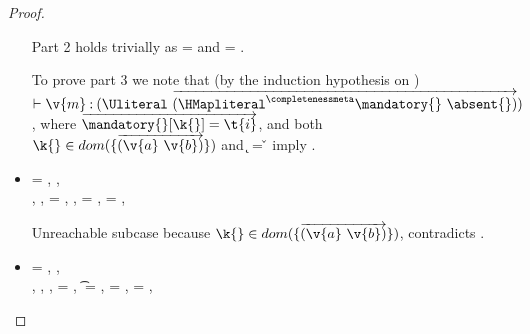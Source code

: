 \begin{lemma}
\begin{proof}
\begin{case}[B-Get]
\begin{itemize}
\begin{subcase}[T-GetHMap]
         Part 2 holds trivially as \thenprop{\prop{}} = {\topprop{}}
         and \elseprop{\prop{}} = {\topprop{}}.

         To prove part 3 we note that (by the induction hypothesis on )
         $\judgementtwo{}{\v{m}}{\Unionsplice{\overrightarrow {\HMapgeneric {\mandatory{}} {\absent{}}}}}$,
         where $\overrightarrow{\inmandatory{\k{}}{\t{i}}{\mandatory{}}}$, and 
         both
         $\keyinmap{\k{}}{\curlymap{\overrightarrow{({\v{a}}\ {\v{b}})}}}$
         and
          {\k{}} = {\v{}}
         imply .

      \end{subcase}
    \item[]
      \begin{subcase}[T-GetHMapAbsent]
  \ep{} = { {}},
  \judgementtworewrite {\propenv{}} {} {} {},
  \\
  \judgementrewrite {\propenv{}} {} {\HMapgeneric {\mandatory{}} {\absent}}
           { {}}
           {}
           {},
  {\inabsent{\k{}}{\absent{}}},
  \e{} = { {}},
  \issubtypein{}{\Nil}{\t{}},
  \thenprop{\prop{}} = {\topprop{}},
  \elseprop{\prop{}} = {\topprop{}},
                        {\object{}}

       Unreachable subcase because 
         $\keyinmap{\k{}}{\curlymap{\overrightarrow{({\v{a}}\ {\v{b}})}}}$,
         contradicts
                {\inabsent{\k{}}{\absent{}}}.
      \end{subcase}
    \item[]
      \begin{subcase}[T-GetHMapPartialDefault]
  \ep{} = { {}},
  \judgementtworewrite {\propenv{}} {} {}{},
  \\
 \judgementrewrite {\propenv{}} {} {\HMapp {\mandatory{}} {\absent}}
           { {}}
           {}
           {},
             {\notinmandatory{\k{}}{\t{}}{\mandatory{}}},
             {\notinabsent{\k{}}{\absent{}}},
  \e{} = { {}},
  \t{} = \Top,
  \thenprop{\prop{}} = {\topprop{}},
  \elseprop{\prop{}} = {\topprop{}},


\end{subcase}
\end{itemize}
\end{case}
\end{proof}
\end{lemma}
